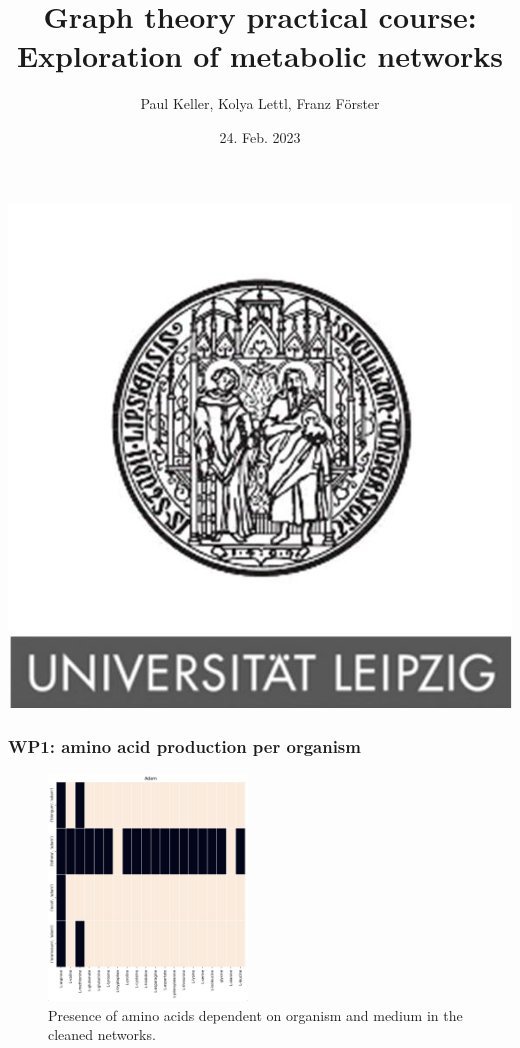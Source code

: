 \documentclass[serif,10pt,aspectratio=169]{beamer}
\title[{\sc Metabolic Network Analysis} \hspace{3.5cm} \insertframenumber/\inserttotalframenumber]{\sc Graph theory practical course:\\
Exploration of metabolic networks}
\author[Graphen und biologische Netzwerke --- Praktikum]{{Paul Keller, Kolya Lettl, Franz Förster}}
\date{24. Feb. 2023}
\institute{Universität Leipzig \\ Fakultät Mathematik und Informatik \\ Institut für Bioinformatik}
\begin{document}
\begin{frame}
  \begin{center}
    \includegraphics[scale=0.20]{images/logo-Leipzig.png}
  \end{center}
  \titlepage
\end{frame}

\begin{frame}\frametitle{WP1: amino acid production per organism}
	\begin{figure}
		\includegraphics[height=6cm]{images/aa_presence_clean.jpg}
		\caption{Presence of amino acids dependent on organism and medium in the cleaned networks.}
	\end{figure}
\end{frame}
\end{document}
